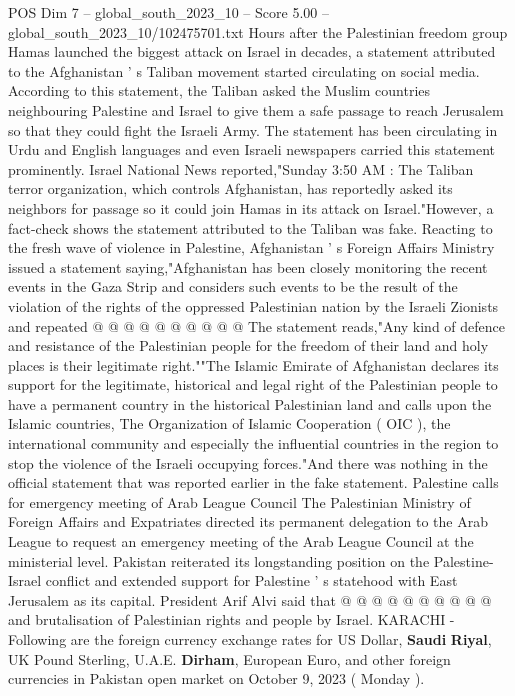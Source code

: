 \begin{textsample}{POS Dim 7 – global\_south\_2023\_10 – Score 5.00 – global\_south\_2023\_10/102475701.txt}  \label{ex:f7_pos_135}
Hours after the Palestinian freedom group Hamas launched the biggest attack on Israel in decades, a statement attributed to the Afghanistan ' s Taliban movement started circulating on social media.
According to this statement, the Taliban asked the Muslim countries neighbouring Palestine and Israel to give them a safe passage to reach Jerusalem so that they could fight the Israeli Army.
The statement has been circulating in Urdu and English languages and even Israeli newspapers carried this statement prominently.
Israel National News reported,"Sunday 3:50 AM : The Taliban terror organization, which controls Afghanistan, has reportedly asked its neighbors for passage so it could join Hamas in its attack on Israel."However, a fact-check shows the statement attributed to the Taliban was fake.
Reacting to the fresh wave of violence in Palestine, Afghanistan ' s Foreign Affairs Ministry issued a statement saying,"Afghanistan has been closely monitoring the recent events in the Gaza Strip and considers such events to be the result of the violation of the rights of the oppressed Palestinian nation by the Israeli Zionists and repeated @ @ @ @ @ @ @ @ @ @ The statement reads,"Any kind of defence and resistance of the Palestinian people for the freedom of their land and holy places is their legitimate right.""The Islamic Emirate of Afghanistan declares its support for the legitimate, historical and legal right of the Palestinian people to have a permanent country in the historical Palestinian land and calls upon the Islamic countries, The Organization of Islamic Cooperation ( OIC ), the international community and especially the influential countries in the region to stop the violence of the Israeli occupying forces."And there was nothing in the official statement that was reported earlier in the fake statement.
Palestine calls for emergency meeting of Arab League Council The Palestinian Ministry of Foreign Affairs and Expatriates directed its permanent delegation to the Arab League to request an emergency meeting of the Arab League Council at the ministerial level.
Pakistan reiterated its longstanding position on the Palestine-Israel conflict and extended support for Palestine ' s statehood with East Jerusalem as its capital.
President Arif Alvi said that @ @ @ @ @ @ @ @ @ @ and brutalisation of Palestinian rights and people by Israel.
KARACHI - Following are the foreign currency exchange rates for US Dollar, \textbf{Saudi} \textbf{Riyal}, UK Pound Sterling, U.A.E. \textbf{Dirham}, European Euro, and other foreign currencies in Pakistan open market on October 9, 2023 ( Monday ).

\end{textsample}
